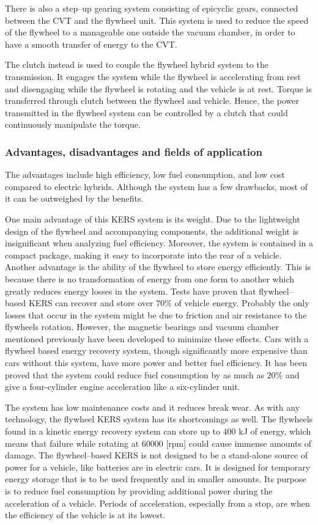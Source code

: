 \documentclass[11pt]{article}
\begin{document}
There is also a step--up gearing system consisting of epicyclic gears, connected between the CVT and the flywheel unit. This system is used to reduce the speed of the flywheel to a manageable one outside the vacuum chamber, in order to have a smooth transfer of energy to the CVT.

The clutch instead is used to couple the flywheel hybrid system to the transmission. It engages the system while the flywheel is accelerating from rest and disengaging while the flywheel is rotating and the vehicle is at rest. Torque is transferred through clutch between the flywheel and vehicle. Hence, the power transmitted in the flywheel system can be controlled by a clutch that could continuously manipulate the torque.

\subsubsection{Advantages, disadvantages and fields of application}

The advantages include high efficiency, low fuel consumption, and low cost compared to electric hybrids. Although the system has a few drawbacks, most of it can be outweighed by the benefits. 

One main advantage of this KERS system is its weight. Due to the lightweight design of the flywheel and accompanying components, the additional weight is insignificant when analyzing fuel efficiency. Moreover, the system is contained in a compact package, making it easy to incorporate into the rear of a vehicle. Another advantage is the ability of the flywheel to store energy efficiently. This is because there is no transformation of energy from one form to another which greatly reduces energy losses in the system. Tests have proven that flywheel--based KERS can recover and store over $70\%$ of vehicle energy. Probably the only losses that occur in the system might be due to friction and air resistance to the flywheels rotation. However, the magnetic bearings and vacuum chamber mentioned previously have been developed to minimize these effects. Cars with a flywheel based energy recovery system, though significantly more expensive than cars without this system, have more power and better fuel efficiency. It has been proved that the system could reduce fuel consumption by as much as $20$\% and give a four-cylinder engine acceleration like a six-cylinder unit.

The system has low maintenance costs and it reduces break wear. As with any technology, the flywheel KERS system has its shortcomings as well. The flywheels found in a kinetic energy recovery system can store up to $400$ kJ of energy, which means that failure while rotating at $60000$ [rpm] could cause immense amounts of damage. The flywheel--based KERS is not designed to be a stand-alone source of power for a vehicle, like batteries are in electric cars. It is designed for temporary energy storage that is to be used frequently and in smaller amounts. Its purpose is to reduce fuel consumption by providing additional power during the acceleration of a vehicle. Periods of acceleration, especially from a stop, are when the efficiency of the vehicle is at its lowest.
\end{document}
